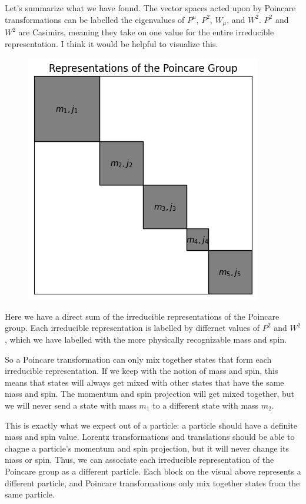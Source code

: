 \documentclass[12pt]{article}
\begin{document}

Let's summarize what we have found. The vector spaces acted upon by Poincare transformations can be labelled the eigenvalues of $P^\mu$, $P^2$, $W_\mu$, and $W^2$. $P^2$ and $W^2$ are Casimirs, meaning they take on one value for the entire irreducible representation. I think it would be helpful to visualize this.
\begin{figure}[h!]
    \centering
    \includegraphics{irrep_visual.png}
\end{figure}

Here we have a direct sum of the irreducible representations of the Poincare group. Each irreducible representation is labelled by differnet values of $P^2$ and $W^2$, which we have labelled with the more physically recognizable mass and spin. 

So a Poincare transformation can only mix together states that form each irreducible representation. If we keep with the notion of mass and spin, this means that states will always get mixed with other states that have the same mass and spin. The momentum and spin projection will get mixed together, but we will never send a state with mass $m_1$ to a different state with mass $m_2$.

This is exactly what we expect out of a particle: a particle should have a definite mass and spin value. Lorentz transformations and translations should be able to chagne a particle's momentum and spin projection, but it will never change its mass or spin. Thus, we can associate each irreducible representation of the Poincare group as a different particle. Each block on the visual above represents a different particle, and Poincare transformations only mix together states from the same particle. 
\end{document}
